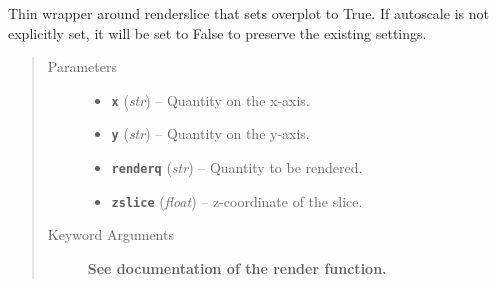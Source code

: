 \documentclass[letterpaper,10pt,english]{sphinxmanual}
\begin{document}
\begin{fulllineitems}
\label{index:facade.addrenderslice}
Thin wrapper around renderslice that sets overplot to True.  If autoscale is
not explicitly set, it will be set to False to preserve the existing settings.
\begin{quote}\begin{description}
\item[{Parameters}] \leavevmode\begin{itemize}
\item {} 
\textbf{\texttt{x}} (\emph{str}) -- Quantity on the x-axis.

\item {} 
\textbf{\texttt{y}} (\emph{str}) -- Quantity on the y-axis.

\item {} 
\textbf{\texttt{renderq}} (\emph{str}) -- Quantity to be rendered.

\item {} 
\textbf{\texttt{zslice}} (\emph{float}) -- z-coordinate of the slice.

\end{itemize}

\item[{Keyword Arguments}] \leavevmode
\textbf{See documentation of the render function.}

\end{description}\end{quote}

\end{fulllineitems}

\end{document}
